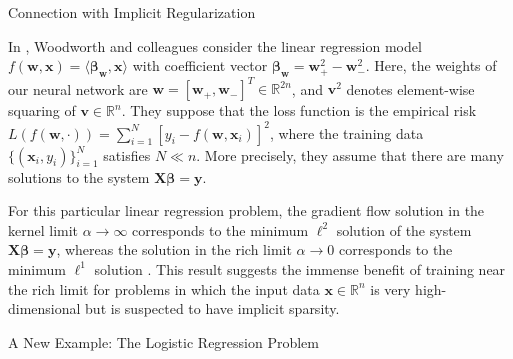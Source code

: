 \documentclass[final, 20pt]{beamer}
\newlength{\colwidth}
\begin{document}
\begin{frame}[t]
\begin{columns}[t]
\begin{column}{\colwidth}

    \begin{block}{Connection with Implicit Regularization}
    
    In \cite{woodworth2020kernel}, Woodworth and colleagues consider the linear regression model $f(\boldsymbol{w}, \boldsymbol{x}) = \langle \boldsymbol{\beta}_{\boldsymbol{w}}, \boldsymbol{x} \rangle$ with coefficient vector $\boldsymbol{\beta}_{\boldsymbol{w}} = \boldsymbol{w}_+^2 - \boldsymbol{w}_-^2$. Here, the weights of our neural network are $\boldsymbol{w} = [\boldsymbol{w}_+, \boldsymbol{w}_-]^T \in \mathbb{R}^{2n}$, and $\boldsymbol{v}^2$ denotes element-wise squaring of $\boldsymbol{v} \in \mathbb{R}^n$. They suppose that the loss function is the empirical risk $L(f(\boldsymbol{w}, \cdot)) = \sum_{i=1}^N [y_i - f(\boldsymbol{w}, \boldsymbol{x}_i)]^2$,
    where the training data $\{(\boldsymbol{x}_i, y_i) \}_{i=1}^N$ satisfies $N \ll n$. More precisely, they assume that there are many solutions to the system $\boldsymbol{X} \boldsymbol{\beta} = \boldsymbol{y}$. 
    
    For this particular linear regression problem, the gradient flow solution in the kernel limit $\alpha \rightarrow \infty$ corresponds to the minimum $\ell^2$ solution of the system $\boldsymbol{X} \boldsymbol{\beta} = \boldsymbol{y}$, whereas the solution in the rich limit $\alpha \rightarrow 0$ corresponds to the minimum $\ell^1$ solution \cite{woodworth2020kernel}. This result suggests the immense benefit of training near the rich limit for problems in which the input data $\boldsymbol{x} \in \mathbb{R}^n$ is very high-dimensional but is suspected to have implicit sparsity. 
    
    \end{block}
    
    \begin{block}{A New Example: The Logistic Regression Problem}
    

\end{block}
\end{column}
\end{columns}
\end{frame}
\end{document}
